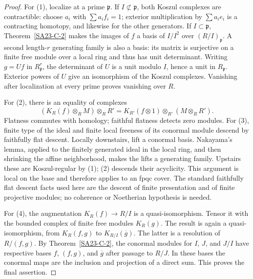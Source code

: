 \begin{proof}
For (1), localize at a prime $\mathfrak p$.  If $I\not\subset\mathfrak p$,
both Koszul complexes are contractible: choose $a_i$ with
$\sum a_i f_i=1$; exterior multiplication by $\sum a_i e_i$ is a
contracting homotopy, and likewise for the other generators.  If
$I\subset\mathfrak p$, Theorem~\ref{SA23-C-2} makes the images of
$f$ a basis of $I/I^2$ over $(R/I)_\mathfrak p$.  A second length-$r$
generating family is also a basis: its matrix is surjective on a
finite free module over a local ring and thus has unit determinant.
Writing $g=Uf$ in $R_\mathfrak p^r$, the determinant of $U$ is a
unit modulo $I$, hence a unit in $R_\mathfrak p$.  Exterior powers of
$U$ give an isomorphism of the Koszul complexes.  Vanishing after
localization at every prime proves vanishing over $R$.

For (2), there is an equality of complexes
\[
 (K_R(f)\otimes_R M)\otimes_R R'
 =K_{R'}(f\otimes1)\otimes_{R'}(M\otimes_R R').
\]
Flatness commutes with homology; faithful flatness detects zero modules.
For (3), finite type of the ideal and finite local freeness of its
conormal module descend by faithfully flat descent.  Locally downstairs,
lift a conormal basis.  Nakayama's lemma, applied to the finitely
generated ideal in the local ring, and then shrinking the affine
neighborhood, makes the lifts a generating family.  Upstairs these are
Koszul-regular by (1); (2) descends their acyclicity.  This argument is
local on the base and therefore applies to an fpqc cover.  The standard
faithfully flat descent facts used here are the descent of finite
presentation and of finite projective modules; no coherence or
Noetherian hypothesis is needed.

For (4), the augmentation $K_R(f)\to R/I$ is a quasi-isomorphism.
Tensor it with the bounded complex of finite free modules $K_R(g)$.
The result is again a quasi-isomorphism, from $K_R(f,g)$ to
$K_{R/I}(\overline g)$.  The latter is a resolution of $R/(f,g)$.
By Theorem~\ref{SA23-C-2}, the conormal modules for $I$, $J$,
and $J/I$ have respective bases $f$, $(f,g)$, and $\overline g$
after passage to $R/J$.  In these bases the conormal maps are
the inclusion and projection of a direct sum.  This proves
the final assertion.
\end{proof}

